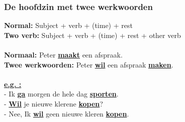 \documentclass[a4paper,14pt]{extarticle}
\newcommand{\emp}[1]{\underline{\textbf{#1}}}
\begin{document}
\subsubsection{De hoofdzin met twee werkwoorden}
\textbf{Normal:} Subject + verb + (time) + rest  \\
\textbf{Two verb:} Subject + verb + (time) + rest + other verb \\
\\
\textbf{Normaal:} Peter \emp{maakt} een afspraak.\\
\textbf{Twee werkwoorden:} Peter \emp{wil} een afspraak \emp{maken}. \\
\hfill \\
\emp{e.g. :} \\
- Ik \emp{ga} morgen de hele dag \emp{sporten}. \\
- \emp{Wil} je nieuwe klerene \emp{kopen}? \\
- Nee, Ik \emp{wil} geen nieuwe kleren \emp{kopen}. \\
\\
\end{document}
